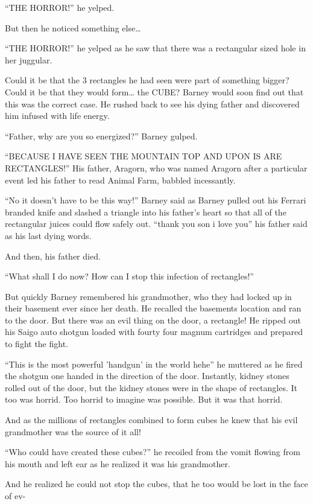 ``THE HORROR!'' he yelped.

But then he noticed something else{\ldots}

``THE HORROR!'' he yelped as he saw that there was a rectangular
sized hole in her juggular.

Could it be that the 3 rectangles he had seen were part of
something bigger? Could it be that they would form{\ldots} the CUBE?
Barney would soon find out that this was the correct case. He
rushed back to see his dying father and discovered him infused with
life energy.

``Father, why are you so energized?'' Barney gulped.

``BECAUSE I HAVE SEEN THE MOUNTAIN TOP AND UPON IS ARE RECTANGLES!''
His father, Aragorn, who was named Aragorn after a particular event
led his father to read Animal Farm, babbled incessantly.

``No it doesn't have to be this way!'' Barney said as Barney pulled
out his Ferrari branded knife and slashed a triangle into his
father's heart so that all of the rectangular juices could flow
safely out. ``thank you son i love you'' his father said as his last
dying words.

And then, his father died.

``What shall I do now? How can I stop this infection of
rectangles!''

But quickly Barney remembered his grandmother, who they had locked
up in their basement ever since her death. He recalled the
basements location and ran to the door. But there was an evil thing
on the door, a rectangle! He ripped out his Saigo auto shotgun
loaded with fourty four magnum cartridges and prepared to fight the
fight.

``This is the most powerful 'handgun' in the world hehe'' he muttered
as he fired the shotgun one handed in the direction of the door.
Instantly, kidney stones rolled out of the door, but the kidney
stones were in the shape of rectangles. It too was horrid. Too
horrid to imagine was possible. But it was that horrid.

And as the millions of rectangles combined to form cubes he knew
that his evil grandmother was the source of it all!

``Who could have created these cubes?'' he recoiled from the vomit
flowing from his mouth and left ear as he realized it was his
grandmother.

And he realized he could not stop the cubes, that he too would be
lost in the face of ev-

